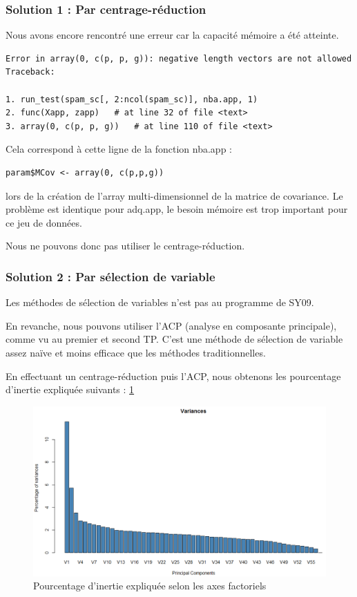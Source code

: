 \documentclass{article}
\begin{document}
\subsubsection{Solution 1 : Par centrage-réduction}
Nous avons encore rencontré une erreur car la capacité mémoire a été atteinte.

\begin{lstlisting}
Error in array(0, c(p, p, g)): negative length vectors are not allowed
Traceback:

1. run_test(spam_sc[, 2:ncol(spam_sc)], nba.app, 1)
2. func(Xapp, zapp)   # at line 32 of file <text>
3. array(0, c(p, p, g))   # at line 110 of file <text>
\end{lstlisting}

Cela correspond à cette ligne de la fonction nba.app :
\begin{lstlisting}
param$MCov <- array(0, c(p,p,g))
\end{lstlisting}
lors de la création de l'array multi-dimensionnel de la matrice de covariance.
Le problème est identique pour adq.app, le besoin mémoire est trop important pour ce jeu de données.

Nous ne pouvons donc pas utiliser le centrage-réduction.

\subsubsection{Solution 2 : Par sélection de variable}
Les méthodes de sélection de variables n'est pas au programme de SY09. 

En revanche, nous pouvons utiliser l'ACP (analyse en composante principale), comme vu au premier et second TP. C'est une méthode de sélection de variable assez naïve et moins efficace que les méthodes traditionnelles.

En effectuant un centrage-réduction puis l'ACP, nous obtenons les pourcentage d'inertie expliquée suivants : \ref{acp_eigen}

\begin{figure}[H]
\centering   
    \includegraphics[width=15cm]{img/acp_eigen_percent.PNG}   
    \caption{Pourcentage d'inertie expliquée selon les axes factoriels}   
    \label{acp_eigen}   
    
\end{figure}
 
\end{document}

